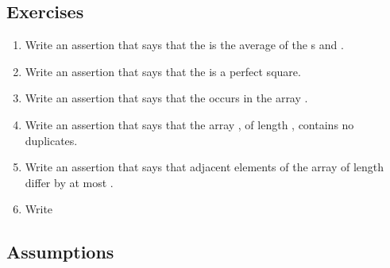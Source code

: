 %

\subsection*{Exercises}
\begin{enumerate}
\item Write an assertion that says that the   is the average of
  the s  and .
\item Write an assertion that says that the   is a
  perfect square.
\item Write an assertion that says that the   occurs
  in the  array .
\item Write an assertion that says that the  array ,
  of length , contains no duplicates.
\item Write an assertion that says that adjacent elements of the
   array  of length  differ by at most .
\item Write 
\end{enumerate}

\subsection{Assumptions}

